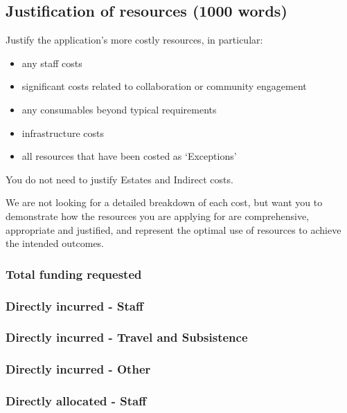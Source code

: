 \documentclass[12pt]{article}
\newenvironment{instruction}{%
    \begin{tcolorbox}[colback=red!5,colframe=red,title=Instruction]%
}{%
    \end{tcolorbox}%
}
\begin{document}
\subsection{Justification of resources (1000 words)}

\begin{instruction}

Justify the application’s more costly resources, in particular:

\begin{itemize}
    \item any staff costs
    \item significant costs related to collaboration or community engagement
    \item any consumables beyond typical requirements
    \item infrastructure costs
    \item all resources that have been costed as ‘Exceptions’
\end{itemize}

You do not need to justify Estates and Indirect costs.

We are not looking for a detailed breakdown of each cost, but want you to demonstrate how the resources you are applying for are comprehensive, appropriate and justified, and represent the optimal use of resources to achieve the intended outcomes.

\end{instruction}

\subsubsection{Total funding requested}

\subsubsection{Directly incurred - Staff}

\subsubsection{Directly incurred - Travel and Subsistence}

\subsubsection{Directly incurred - Other}

\subsubsection{Directly allocated - Staff}
\end{document}
